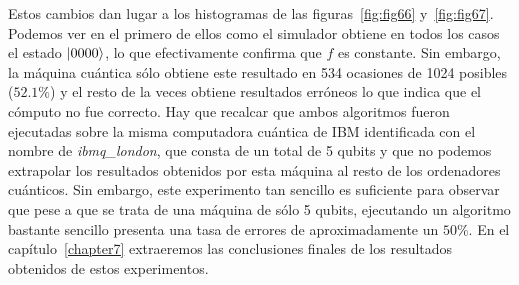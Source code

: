 Estos cambios dan lugar a los  histogramas de las figuras~\ref{fig:fig66} y~\ref{fig:fig67}. Podemos ver en el primero de ellos como el simulador obtiene en todos los casos el estado $\left|0000\right\rangle$, lo que efectivamente confirma que $f$ es constante. Sin embargo, la máquina cuántica sólo obtiene este resultado en 534 ocasiones de 1024 posibles ($52.1\%$) y el resto de la veces obtiene resultados erróneos lo que indica que el cómputo no fue correcto. Hay que recalcar que ambos algoritmos fueron ejecutadas sobre la misma computadora cuántica de IBM identificada con el nombre de \textit{ibmq\_london}, que consta de un total de 5 qubits y que no podemos extrapolar los resultados obtenidos por esta máquina al resto de los ordenadores cuánticos. Sin embargo, este experimento tan sencillo es suficiente para observar que pese a que se trata de una máquina de sólo 5 qubits, ejecutando un algoritmo bastante sencillo presenta una tasa de errores de aproximadamente un $50\%$. En el capítulo~\ref{chapter7} extraeremos las conclusiones finales de los resultados obtenidos de estos experimentos.

